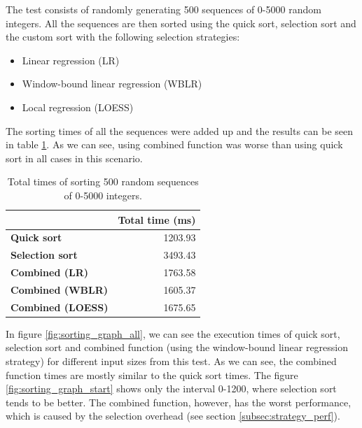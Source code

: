 The test consists of randomly generating 500 sequences of 0-5000 random integers. All the sequences are then sorted using the quick sort, selection sort and the custom sort with the following selection strategies:
\begin{itemize}
	\item Linear regression (LR)
	\item Window-bound linear regression (WBLR)
	\item Local regression (LOESS)
\end{itemize}

The sorting times of all the sequences were added up and the results can be seen in table \ref{tab:sorting_results}. As we can see, using combined function was worse than using quick sort in all cases in this scenario.

\begin{table}[h!]
	\captionsetup{justification=centering,margin=0.5cm}
	\bgroup
	\def\arraystretch{1.5}%
	\begin{center}
	\begin{tabular}{|l|r|}
		\hline
		& \multicolumn{1}{c|}{\textbf{Total time (ms)}} \\ \hline
		\textbf{Quick sort}                  & 1203.93                                       \\ \hline
		\textbf{Selection sort}              & 3493.43                                       \\ \hline
		\textbf{Combined (LR)}               & 1763.58                                       \\ \hline
		\textbf{Combined (WBLR)}  & 1605.37                                       \\ \hline
		\textbf{Combined (LOESS)} & 1675.65                                       \\ \hline
	\end{tabular}
\end{center}
\egroup
\caption{Total times of sorting 500 random sequences of 0-5000 integers.}
\label{tab:sorting_results}
\end{table}

In figure \ref{fig:sorting_graph_all}, we can see the execution times of quick sort, selection sort and combined function (using the window-bound linear regression strategy) for different input sizes from this test. As we can see, the combined function times are mostly similar to the quick sort times. The figure \ref{fig:sorting_graph_start} shows only the interval 0-1200, where selection sort tends to be better. The combined function, however, has the worst performance, which is caused by the selection overhead (see section \ref{subsec:strategy_perf}).


